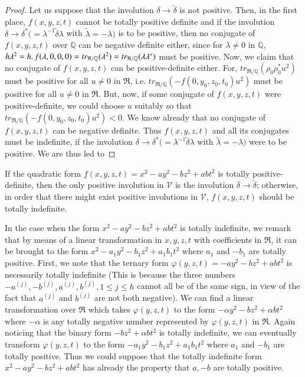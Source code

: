 \begin{proof}
Let us suppose that the involution $\delta \rightarrow
\widetilde{\delta}$ is not positive. Then, in the first place,
$f(x,y,z,t)$ cannot be totally positive definite \pageoriginale and if
the involution $\delta\rightarrow \delta^{\ast}(=\lambda^{-1}
\widetilde{\delta} \lambda$ with $\widetilde{\lambda} = - \lambda)$
is to be positive, then no conjugate of $f(x,y,z,t)$ over $\mathbb{Q}$
can be negative definite either, since for $\lambda \neq 0$ in
$\mathbb{Q}$, $h\lambda^2 = h\ldotp f(\lambda,
0,0,0)=tr_{\mathfrak{R}/\mathbb{Q}}(\lambda^2) =
tr_{\mathfrak{R}/\mathbb{Q}}(\lambda \lambda^{\ast})$ must be
positive. Now, we claim that no conjugate of $f(x,y,z,t)$ can be
positive-definite either. For, $tr_{\mathfrak{R}/\mathbb{Q}}(\rho_0
\rho^{\ast}_0 u^2)$ must be positive for all $u\neq 0$ in
$\mathfrak{R}$, i.e. $tr_{\mathfrak{R}/\mathbb{Q}}(-f(0,y_0,z_0,
t_0)u^2)$ must be positive for all $u \neq 0$ in $\mathfrak{R}$. But,
now, if some conjugate of $f(x,y,z,t)$ were positive-definite, we
could choose $u$ suitably so that $tr_{\mathfrak{R}/\mathbb{Q}}
(-f(0,y_0,z_0,t_0)u^2)<0$. We know already that no conjugate of
$f(x,y,z,t)$ can be negative definite. Thus $f(x,y,z,t)$ and all its
conjugates must be indefinite, if the involution $\delta \rightarrow
\delta^{\ast} (=\lambda^{-1} \widetilde{\delta} \lambda$ with
$\widetilde{\lambda} = - \lambda)$ were to be positive. We are thus
led to
\end{proof}

\begin{proposition}
If the quadratic form $f(x,y,z,t) = x^2 - ay^2 - bz^2 + abt^2$ is
totally positive-definite, then the only positive involution in
$\mathscr{V}$ is the involution $\delta \rightarrow
\widetilde{\delta}$; otherwise, in order that there might exist
positive involutions in $\mathscr{V}$, $f(x,y,z,t)$ should be totally
indefinite. 
 \end{proposition}

In the case when the form $x^2-ay^2-bz^2 + abt^2$ is totally
indefinite, we remark that by means of a linear transformation in
$x,y,z,t$ with coefficients in $\mathfrak{R}$, it can be brought to
the form $x^2 - a_1y^2 - b_1 z^2+a_1 b_1 t^2$ where $a_1$ and $-b_1$
are totally positive. First, we note that the ternary form
$\varphi(y,z,t) = - ay^2 - bz^2 + abt^2$ is necessarily totally
indefinite (This is because the three numbers $-a^{(j)}, -b^{(j)},
a^{(j)}, b^{(j)}, 1 \leq j \leq h$ cannot all be of the same sign, in
\pageoriginale view of the fact that $a^{(j)}$ and $b^{(j)}$ are not
both negative). We can find a linear transformation over
$\mathfrak{R}$ which takes $\varphi(y,z,t)$ to the form $-\alpha y^2 - bz^2+
\alpha bt^2$ where $-\alpha$ is any totally negative number
represented by $\varphi(y,z,t)$ in $\mathfrak{R}$. Again noticing that
the binary form $-bz^2 + \alpha bt^2$ is totally indefinite, we can
eventually transform $\varphi(y,z,t)$ to the form $-a_1y^2 -b_1z^2 +
a_1b_1t^2$ where $a_1$ and $-b_1$ are totally positive. Thus we could
suppose that the totally indefinite form $x^2 - ay^2 - bz^2 + ab t^2$
has already the property that $a,-b$ are totally positive.

